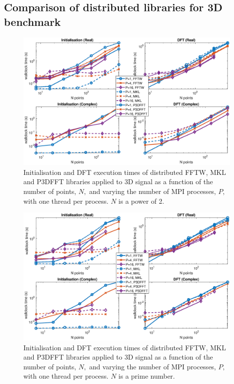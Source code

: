 \documentclass[a4paper]{article}
\begin{document}
\subsection{Comparison of distributed libraries for 3D benchmark}\label{Sec:3DDistComp}


\begin{figure}[htb]
    \centering
    \includegraphics[width=\linewidth]{../results/fftw_mkl_p3dfft_2_3d_mpi.eps}
  \caption{Initialisation and DFT execution times of distributed FFTW, MKL and P3DFFT libraries applied to 3D signal as a function of the
    number of points, $N,$ and varying the number of MPI processes, $P,$ with one thread per process. $N$ is a power of 2.}
  \label{3DDistFFTWMKLP3DFFT2}
\end{figure}


\begin{figure}[htb]
    \centering
    \includegraphics[width=\linewidth]{../results/fftw_mkl_p3dfft_prime_3d_mpi.eps}
  \caption{Initialisation and DFT execution times of distributed FFTW, MKL and P3DFFT libraries applied to 3D signal as a function of the
    number of points, $N,$ and varying the number of MPI processes, $P,$ with one thread per process. $N$ is a prime number.}
  \label{3DDistFFTWMKLP3DFFTprime}
\end{figure}
\end{document}
